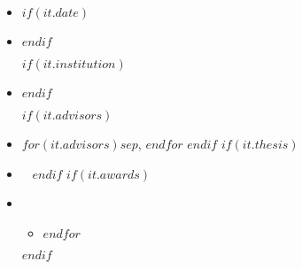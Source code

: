 \begin{itemize}[itemsep=0pt]

  \item {}

  $if(it.date)$\item {}$endif$

  $if(it.institution)$\item {}$endif$

  $if(it.advisors)$\item \quad {}
  $for(it.advisors)$$sep$, $endfor$
  $endif$
  $if(it.thesis)$\item \quad \printthesisheading
  ~
  $endif$
  $if(it.awards)$\item \quad \printawardsheading
  \begin{itemize}[label=\(\diamond\),leftmargin=20pt,itemsep=0pt]
    $for(it.awards)$\item {}$endfor$
  \end{itemize}
  $endif$
\end{itemize}
